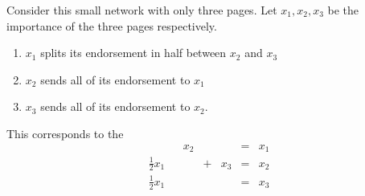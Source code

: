 \begin{applicationActivities}
\begin{example}
Consider this small network with only three pages.  Let $x_1, x_2, x_3$ be the importance of the three pages respectively.

\begin{multicols}{2}
\begin{center}
\end{center}

\columnbreak

\begin{enumerate}
\item $x_1$ splits its endorsement in half between $x_2$ and $x_3$
\item $x_2$ sends all of its endorsement to $x_1$
\item $x_3$ sends all of its endorsement to $x_2$.
\end{enumerate}

This corresponds to the 
\begin{alignat*}{4}
  && x_2 && &=& x_1 \\
\frac{1}{2} x_1&& &+&x_3 &=& x_2 \\
\frac{1}{2} x_1&& && &=& x_3
\end{alignat*}
\end{multicols}
\end{example}





\begin{observation}
  \begin{multicols}{2}
  \begin{center}
\end{center}
\end{multicols}
\end{observation}
\end{applicationActivities}
